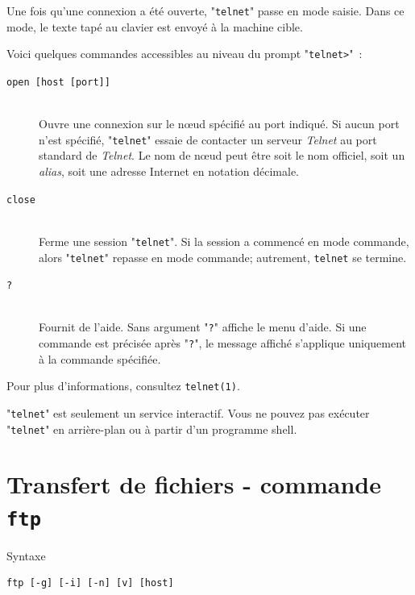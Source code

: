 Une fois qu'une connexion a {\'e}t{\'e} ouverte, "{\tt telnet}" passe en mode
saisie. Dans ce mode, le texte tap{\'e} au clavier est envoy{\'e} {\`a} la machine
cible.

Voici quelques commandes accessibles au niveau du prompt "\verb=telnet>="~:

\begin{description}
	\item[{\tt open [host [port]]}]\mbox{}\\
		Ouvre une connexion sur le n{\oe}ud sp{\'e}cifi{\'e} au port indiqu{\'e}. Si aucun
		port n'est sp{\'e}cifi{\'e}, "{\tt telnet}" essaie de contacter un serveur
		{\sl Telnet} au port standard de {\sl Telnet}. Le nom de n{\oe}ud peut
		{\^e}tre soit le nom officiel, soit un {\sl alias}, soit une adresse Internet
		en notation d{\'e}cimale.
	\item[{\tt close}]\mbox{}\\
		Ferme une session "{\tt telnet}". Si la session a commenc{\'e} en mode
		commande, alors "{\tt telnet}" repasse en mode commande; autrement,
		{\tt telnet} se termine.
	\item[{\tt ?}]\mbox{}\\
		Fournit de l'aide. Sans argument "{\tt ?}" affiche le menu d'aide. Si
		une commande est pr{\'e}cis{\'e}e apr{\`e}s "{\tt ?}", le message affich{\'e}
		s'applique uniquement {\`a} la commande sp{\'e}cifi{\'e}e.
\end{description}

Pour plus d'informations, consultez {\tt telnet(1)}.

\begin{remarque}
"{\tt telnet}" est seulement un service interactif. Vous ne pouvez pas
ex{\'e}cuter "{\tt telnet}" en arri{\`e}re-plan ou {\`a} partir d'un programme shell.
\end{remarque}

\section{Transfert de fichiers - commande {\tt ftp}}

\begin{definition}{Syntaxe}
\begin{verbatim}
ftp [-g] [-i] [-n] [v] [host]
\end{verbatim}
\end{definition}

